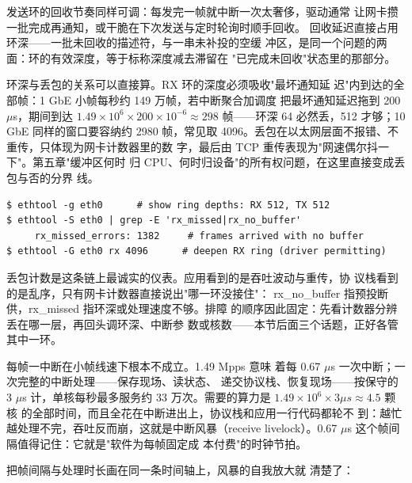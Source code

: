 发送环的回收节奏同样可调：每发完一帧就中断一次太奢侈，驱动通常
让网卡攒一批完成再通知，或干脆在下次发送与定时轮询时顺手回收。
回收延迟直接占用环深——一批未回收的描述符，与一串未补投的空缓
冲区，是同一个问题的两面：环的有效深度，等于标称深度减去滞留在
"已完成未回收"状态里的那部分。

环深与丢包的关系可以直接算。RX 环的深度必须吸收"最坏通知延
迟"内到达的全部帧：1 GbE 小帧每秒约 149 万帧，若中断聚合加调度
把最坏通知延迟拖到 200 $\mu$s，期间到达
$1.49\times10^{6}\times200\times10^{-6}\approx298$ 帧——环深 64
必然丢，512 才够；10 GbE 同样的窗口要容纳约 2980 帧，常见取
4096。丢包在以太网层面不报错、不重传，只体现为网卡计数器里的数
字，最后由 TCP 重传表现为"网速偶尔抖一下"。第五章"缓冲区何时
归 CPU、何时归设备"的所有权问题，在这里直接变成丢包与否的分界
线。

\begin{lstlisting}
$ ethtool -g eth0      # show ring depths: RX 512, TX 512
$ ethtool -S eth0 | grep -E 'rx_missed|rx_no_buffer'
     rx_missed_errors: 1382     # frames arrived with no buffer
$ ethtool -G eth0 rx 4096      # deepen RX ring (driver permitting)
\end{lstlisting}

丢包计数是这条链上最诚实的仪表。应用看到的是吞吐波动与重传，协
议栈看到的是乱序，只有网卡计数器直接说出"哪一环没接住"：
rx\_no\_buffer 指预投断供，rx\_missed 指环深或处理速度不够。排障
的顺序因此固定：先看计数器分辨丢在哪一层，再回头调环深、中断参
数或核数——本节后面三个话题，正好各管其中一环。

每帧一中断在小帧线速下根本不成立。1.49 Mpps 意味
着每 0.67 $\mu$s 一次中断；一次完整的中断处理——保存现场、读状态、
递交协议栈、恢复现场——按保守的 3 $\mu$s 计，单核每秒最多服务约 33
万次。需要的算力是 $1.49\times10^{6}\times3\mu s\approx4.5$ 颗核
的全部时间，而且全花在中断进出上，协议栈和应用一行代码都轮不
到：越忙越处理不完，吞吐反而崩，这就是中断风暴（receive
livelock）。0.67 $\mu$s 这个帧间隔值得记住：它就是"软件为每帧固定成
本付费"的时钟节拍。

把帧间隔与处理时长画在同一条时间轴上，风暴的自我放大就
清楚了：

